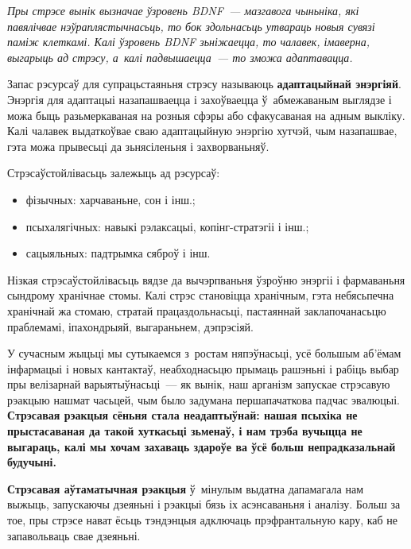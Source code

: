 \emph{Пры стрэсе вынік вызначае ўзровень BDNF~--- мазгавога чыньніка, які павялічвае нэўраплястычнасьць, то бок здольнасьць утвараць новыя сувязі паміж клеткамі. Калі ўзровень BDNF зьніжаецца, то чалавек, імаверна, выгарыць ад стрэсу, а~калі падвышаецца~--- то зможа адаптавацца.}

Запас рэсурсаў для супрацьстаяньня стрэсу называюць \textbf{адаптацыйнай энэргіяй}. Энэргія для адаптацыі назапашваецца і захоўваецца ў~абмежаваным выглядзе і можа быць разьмеркаваная на розныя сфэры або сфакусаваная на адным выкліку. Калі чалавек выдаткоўвае сваю адаптацыйную энэргію хутчэй, чым назапашвае, гэта можа прывесьці да зьнясіленьня і захворваньняў.


Стрэсаўстойлівасьць залежыць ад рэсурсаў: 
\begin{itemize}
  \item фізычных: харчаваньне, сон і інш.;
  \item псыхалягічных: навыкі рэлаксацыі, копінг-стратэгіі і інш.;
  \item сацыяльных: падтрымка сяброў і інш.
\end{itemize}

Нізкая стрэсаўстойлівасьць вядзе да вычэрпваньня ўзроўню энэргіі і фармаваньня сындрому хранічнае стомы. Калі стрэс становіцца хранічным, гэта небясьпечна хранічнай жа стомаю, стратай працаздольнасьці, пастаяннай заклапочанасьцю праблемамі, іпахондрыяй, выгараньнем, дэпрэсіяй. 

У сучасным жыцьці мы сутыкаемся з~ростам няпэўнасьці, усё большым аб'ёмам інфармацыі і новых кантактаў, неабходнасьцю прымаць рашэньні і рабіць выбар пры велізарнай варыятыўнасьці~--- як вынік, наш арганізм запускае стрэсавую рэакцыю нашмат часьцей, чым было задумана першапачаткова падчас эвалюцыі. \textbf{Стрэсавая рэакцыя сёньня стала неадаптыўнай: нашая псыхіка не прыстасаваная да такой хуткасьці зьменаў, і нам трэба вучыцца не выгараць, калі мы хочам захаваць здароўе ва ўсё больш непрадказальнай будучыні.}

\textbf{Стрэсавая аўтаматычная рэакцыя} ў~мінулым выдатна дапамагала нам выжыць, запускаючы дзеяньні і рэакцыі бязь іх асэнсаваньня і аналізу. Больш за тое, пры стрэсе нават ёсьць тэндэнцыя адключаць прэфрантальную кару, каб не запавольваць свае дзеяньні. 

